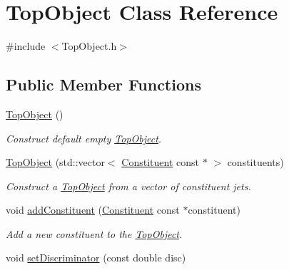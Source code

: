 \hypertarget{classTopObject}{\section{Top\-Object Class Reference}
\label{classTopObject}
}


{\ttfamily \#include $<$Top\-Object.\-h$>$}

\subsection*{Public Member Functions}
\begin{DoxyCompactItemize}
\item 
\hypertarget{classTopObject_a0eb6419f5a625d5ad777df5363e02f90}{\hyperlink{classTopObject_a0eb6419f5a625d5ad777df5363e02f90}{Top\-Object} ()}\label{classTopObject_a0eb6419f5a625d5ad777df5363e02f90}

\begin{DoxyCompactList}\small\item\em Construct default empty \hyperlink{classTopObject}{Top\-Object}. \end{DoxyCompactList}\item 
\hypertarget{classTopObject_a03208b96dc5bdb7bc271ad7303574b8e}{\hyperlink{classTopObject_a03208b96dc5bdb7bc271ad7303574b8e}{Top\-Object} (std\-::vector$<$ \hyperlink{classConstituent}{Constituent} const $\ast$ $>$ constituents)}\label{classTopObject_a03208b96dc5bdb7bc271ad7303574b8e}

\begin{DoxyCompactList}\small\item\em Construct a \hyperlink{classTopObject}{Top\-Object} from a vector of constituent jets. \end{DoxyCompactList}\item 
\hypertarget{classTopObject_adafc98b5660ac2ca92f9115668de2c10}{void \hyperlink{classTopObject_adafc98b5660ac2ca92f9115668de2c10}{add\-Constituent} (\hyperlink{classConstituent}{Constituent} const $\ast$constituent)}\label{classTopObject_adafc98b5660ac2ca92f9115668de2c10}

\begin{DoxyCompactList}\small\item\em Add a new constituent to the \hyperlink{classTopObject}{Top\-Object}. \end{DoxyCompactList}\item 
\hypertarget{classTopObject_abf5123e8c707e9059c8ec96b35643bef}{void \hyperlink{classTopObject_abf5123e8c707e9059c8ec96b35643bef}{set\-Discriminator} (const double disc)}\label{classTopObject_abf5123e8c707e9059c8ec96b35643bef}


\end{DoxyCompactItemize}
